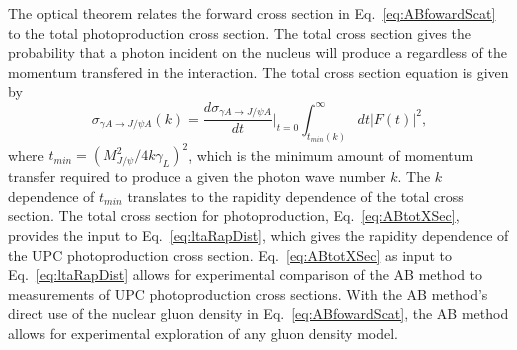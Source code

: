     The optical theorem relates the forward cross section in 
      Eq.~\ref{eq:ABfowardScat} to the total photoproduction cross section. 
    The total cross section gives the probability that a photon incident on 
      the nucleus will produce a \JPsi{} regardless of the momentum transfered 
      in the interaction. 
    The total cross section equation is given by
    \begin{equation} \label{eq:ABtotXSec}
      \sigma_{\gamma A\rightarrow J/\psi A}(k)=
      \frac{d\sigma_{\gamma A\rightarrow J/\psi A}}{dt}\Big|_{t=0}
      \int_{t_{min}(k)}^{\infty}dt|F(t)|^{2},
    \end{equation} 
      where $t_{min}=(M_{J/\psi}^{2}/4k\gamma_{L})^2$, which is the minimum 
      amount of momentum transfer required to produce a \JPsi{} 
      given the photon wave number $k$.
    The $k$ dependence of $t_{min}$ translates to the rapidity 
      dependence of the total cross section.
    The total cross section for photoproduction, Eq.~\ref{eq:ABtotXSec}, 
      provides the input to Eq.~\ref{eq:ltaRapDist}, 
      which gives the rapidity dependence of the UPC photoproduction cross 
      section. 
    Eq.~\ref{eq:ABtotXSec} as input to Eq.~\ref{eq:ltaRapDist} allows for 
      experimental comparison of the AB method to measurements of UPC 
      photoproduction cross sections. 
    With the AB method's direct use of the nuclear gluon density in 
      Eq.~\ref{eq:ABfowardScat}, the AB method allows for experimental 
      exploration of any gluon density model. 
      
